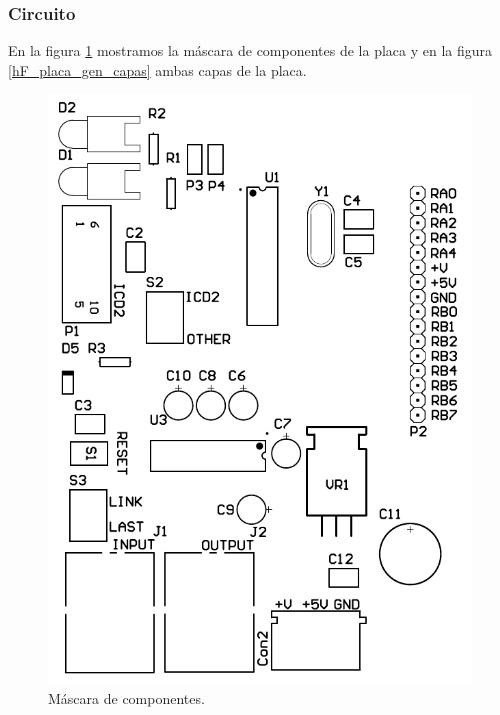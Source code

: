 \subsubsection{Circuito}
\label{h_placas_generica_circuito}

En la figura \ref{hF_placa_gen_componentes} mostramos la m\'ascara de componentes de la placa y en
la figura \ref{hF_placa_gen_capas} ambas capas de la placa.

\begin{figure}
	\centering
	\includegraphics[scale=.2]{gen_componentes.png}
	\caption{M\'ascara de componentes.}
	\label{hF_placa_gen_componentes}
\end{figure}

